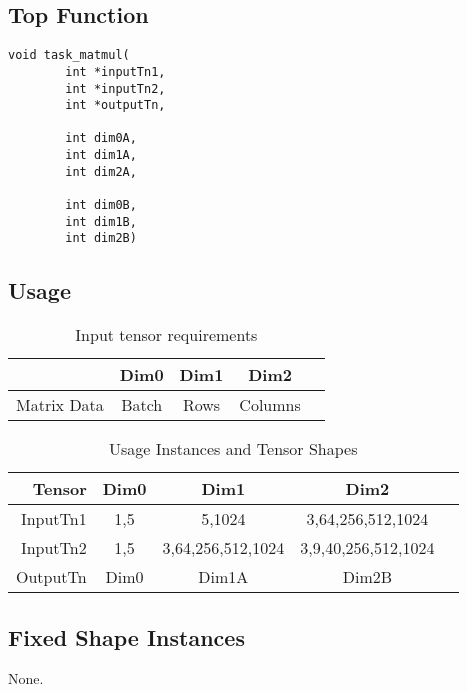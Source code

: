 \documentclass[•]{article}
\begin{document}
\subsection{Top Function}
\begin{lstlisting}
void task_matmul(
		int *inputTn1,
		int *inputTn2,
		int *outputTn,

		int dim0A,
		int dim1A,
		int dim2A,

		int dim0B,
		int dim1B,
		int dim2B)
\end{lstlisting}

\subsection{Usage}

\begin{table}[htbp] %
\caption{Input tensor requirements}
\label{tab:shapes_concat}
	\begin{center}
		\begin{tabular}{|r|c|c|c|c|} 
		\hline	
		 & Dim0 & Dim1 & Dim2\\ 
		\hline	
		Matrix Data &
			Batch &
			Rows &
			Columns\\ 
		\hline 
		\end{tabular}
	\end{center}
\end{table}

\begin{table}[htbp] %
\caption{Usage Instances and Tensor Shapes}
\label{tab:shapes_concat}
	\begin{center}
		\begin{tabular}{|r|c|c|c|c|} 
		\hline	
		Tensor & Dim0 & Dim1 & Dim2\\ 
		\hline	
		InputTn1 &
			1,5 &
			5,1024 &
			3,64,256,512,1024\\ 
		\hline
		InputTn2 &
			1,5 &
			3,64,256,512,1024 &
			3,9,40,256,512,1024\\ 
		\hline
		OutputTn &
			Dim0 & 
			Dim1A & 
			Dim2B \\
		\hline
		\end{tabular}
	\end{center}
\end{table}


\subsection{Fixed Shape Instances}
None.
\end{document}
